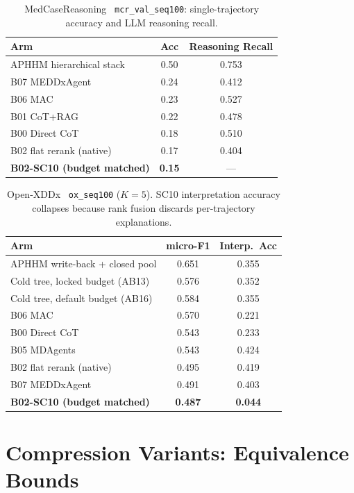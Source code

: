 \begin{table}[t]
\centering
\scriptsize
\caption{MedCaseReasoning~\cite{medcasereasoning} \texttt{mcr\_val\_seq100}: single-trajectory accuracy and LLM reasoning recall.}
\label{tab:mcr-full}
\begin{tabular}{lcc}
\toprule
Arm & Acc & Reasoning Recall \\
\midrule
APHHM hierarchical stack & 0.50 & 0.753 \\
B07 MEDDxAgent & 0.24 & 0.412 \\
B06 MAC & 0.23 & 0.527 \\
B01 CoT+RAG & 0.22 & 0.478 \\
B00 Direct CoT & 0.18 & 0.510 \\
B02 flat rerank (native) & 0.17 & 0.404 \\
\textbf{B02-SC10 (budget matched)} & \textbf{0.15} & --- \\
\bottomrule
\end{tabular}
\end{table}

\begin{table}[t]
\centering
\scriptsize
\caption{Open-XDDx~\cite{dualinf2025} \texttt{ox\_seq100} ($K{=}5$). SC10 interpretation accuracy collapses because rank fusion discards per-trajectory explanations.}
\label{tab:ox-full}
\begin{tabular}{lcc}
\toprule
Arm & micro-F1 & Interp.\ Acc \\
\midrule
APHHM write-back + closed pool & 0.651 & 0.355 \\
Cold tree, locked budget (AB13) & 0.576 & 0.352 \\
Cold tree, default budget (AB16) & 0.584 & 0.355 \\
B06 MAC & 0.570 & 0.221 \\
B00 Direct CoT & 0.543 & 0.233 \\
B05 MDAgents & 0.543 & 0.424 \\
B02 flat rerank (native) & 0.495 & 0.419 \\
B07 MEDDxAgent & 0.491 & 0.403 \\
\textbf{B02-SC10 (budget matched)} & \textbf{0.487} & \textbf{0.044} \\
\bottomrule
\end{tabular}
\end{table}

\section{Compression Variants: Equivalence Bounds}
\label{app:eq-equiv}

